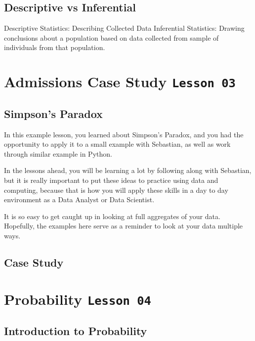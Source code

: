 \documentclass[]{book}
\begin{document}
\subsection{Descriptive vs
Inferential}\label{descriptive-vs-inferential}

Descriptive Statistics: Describing Collected Data Inferential
Statistics: Drawing conclusions about a population based on data
collected from sample of individuals from that population.

\section{\texorpdfstring{Admissions Case Study
\texttt{Lesson\ 03}}{Admissions Case Study Lesson 03}}\label{admissions-case-study-lesson-03}

\subsection{Simpson's Paradox}\label{simpsons-paradox}

In this example lesson, you learned about Simpson's Paradox, and you had
the opportunity to apply it to a small example with Sebastian, as well
as work through similar example in Python.

In the lessons ahead, you will be learning a lot by following along with
Sebastian, but it is really important to put these ideas to practice
using data and computing, because that is how you will apply these
skills in a day to day environment as a Data Analyst or Data Scientist.

It is so easy to get caught up in looking at full aggregates of your
data. Hopefully, the examples here serve as a reminder to look at your
data multiple ways.

\subsection{Case Study}\label{case-study}

\section{\texorpdfstring{Probability
\texttt{Lesson\ 04}}{Probability Lesson 04}}\label{probability-lesson-04}

\subsection{Introduction to
Probability}\label{introduction-to-probability}
\end{document}

